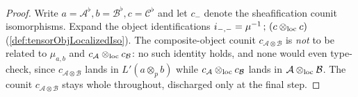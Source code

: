 \begin{proof}
  Write \(a = \mathcal{A}^{\flat}, b = \mathcal{B}^{\flat}, c = \mathcal{C}^{\flat}\) and let
  \(c_{-}\) denote the sheafification counit isomorphisms. Expand the object identifications
  \(i_{-,-} = \mu^{-1}\,;\,(c \mathbin{\otimes_{\mathrm{loc}}} c)\) (\cref{def:tensorObjLocalizedIso}). The composite-object
  counit \(c_{\mathcal{A}\otimes\mathcal{B}}\) is \emph{not} to be related to \(\mu_{a,b}\) and
  \(c_{\mathcal{A}}\mathbin{\otimes_{\mathrm{loc}}} c_{\mathcal{B}}\): no such identity holds, and none would even type-check,
  since \(c_{\mathcal{A}\otimes\mathcal{B}}\) lands in \(L'(a \otimes_p b)\) while
  \(c_{\mathcal{A}}\mathbin{\otimes_{\mathrm{loc}}} c_{\mathcal{B}}\) lands in \(\mathcal{A}\mathbin{\otimes_{\mathrm{loc}}}\mathcal{B}\). The counit
  \(c_{\mathcal{A}\otimes\mathcal{B}}\) stays whole throughout, discharged only at the final step.


\end{proof}
